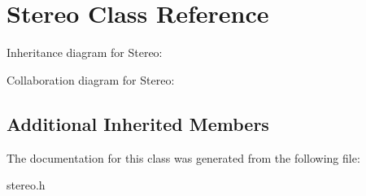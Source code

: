 \hypertarget{classStereo}{}\section{Stereo Class Reference}
\label{classStereo}


Inheritance diagram for Stereo\+:


Collaboration diagram for Stereo\+:
\subsection*{Additional Inherited Members}


The documentation for this class was generated from the following file\+:\begin{DoxyCompactItemize}
\item 
stereo.\+h\end{DoxyCompactItemize}
